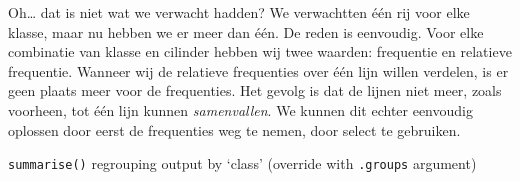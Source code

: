 \documentclass[]{tufte-book}
\newenvironment{Shaded}{}{}
\newcommand{\DataTypeTok}[1]{\textcolor[rgb]{0.56,0.13,0.00}{#1}}
\newcommand{\DecValTok}[1]{\textcolor[rgb]{0.25,0.63,0.44}{#1}}
\newcommand{\KeywordTok}[1]{\textcolor[rgb]{0.00,0.44,0.13}{\textbf{#1}}}
\newcommand{\NormalTok}[1]{#1}
\newcommand{\OperatorTok}[1]{\textcolor[rgb]{0.40,0.40,0.40}{#1}}
\newcommand{\StringTok}[1]{\textcolor[rgb]{0.25,0.44,0.63}{#1}}
\begin{document}
Oh\ldots{} dat is niet wat we verwacht hadden? We verwachtten één rij voor elke klasse, maar nu hebben we er meer dan één. De reden is eenvoudig. Voor elke combinatie van klasse en cilinder hebben wij twee waarden: frequentie en relatieve frequentie. Wanneer wij de relatieve frequenties over één lijn willen verdelen, is er geen plaats meer voor de frequenties. Het gevolg is dat de lijnen niet meer, zoals voorheen, tot één lijn kunnen \emph{samenvallen}. We kunnen dit echter eenvoudig oplossen door eerst de frequenties weg te nemen, door select te gebruiken.

\begin{Shaded}
\end{Shaded}

\texttt{summarise()} regrouping output by `class' (override with \texttt{.groups} argument)
\end{document}
